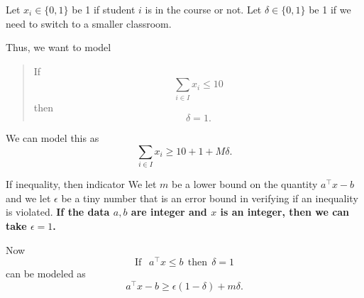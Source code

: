 Let $x_i \in \{0,1\}$ be 1 if student $i$ is in the course or not.   Let $\delta \in \{0,1\}$ be 1 if we need to switch to a smaller classroom.  

Thus, we want to model 
\begin{quote}
If $$
\sum_{i \in I} x_i \leq 10
$$
then 
$$
\delta = 1.
$$
\end{quote}

We can model this as 
\begin{equation}
\sum_{i \in I} x_i \geq 10 + 1 + M\delta.
\end{equation}

\begin{general}{If inequality, then indicator}{}
We let $m$ be a lower bound on the quantity $a^\top x - b$ and we let $\epsilon$ be a tiny number that is an error bound in verifying if an inequality is violated.  \textbf{If the data $a,b$ are integer and $x$ is an integer, then we can take $\epsilon = 1$.}

Now
\begin{equation}
\text{If } \ \ a^\top x \leq b  \ \ \text{then}\ \ \delta = 1
\end{equation}
can be modeled as 
\begin{equation}
a^\top x -b  \geq  \epsilon(1-\delta) + m \delta.
\end{equation}
\end{general}


